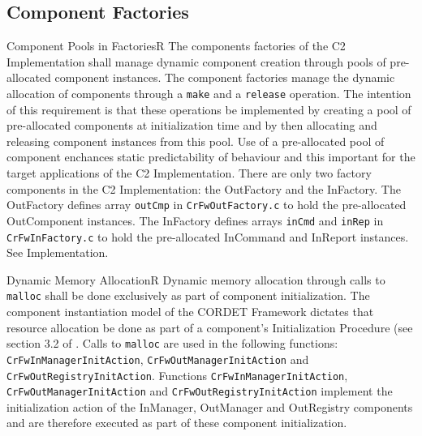 \documentclass{pnp_article}
\begin{document}
\subsection{Component Factories}

\begin{fwReqNote}{Component Pools in Factories}{R}
{The components factories of the C2 Implementation shall manage dynamic component creation through pools of pre-allocated component instances.}
{The component factories manage the dynamic allocation of components through a \texttt{make} and a \texttt{release} operation. The intention of this requirement is that these operations be implemented by creating a pool of pre-allocated components at initialization time and by then allocating and releasing component instances from this pool.}
{Use of a pre-allocated pool of component enchances static predictability of behaviour and this important for the target applications of the C2 Implementation.}
{There are only two factory components in the C2 Implementation: the OutFactory and the InFactory. The OutFactory defines array \texttt{outCmp} in \texttt{CrFwOutFactory.c} to hold the pre-allocated OutComponent instances. The InFactory defines arrays \texttt{inCmd} and \texttt{inRep} in \texttt{CrFwInFactory.c} to hold the pre-allocated InCommand and InReport instances. } 
{See Implementation.}
\end{fwReqNote}




\begin{fwReq}{Dynamic Memory Allocation}{R}
{Dynamic memory allocation through calls to \texttt{malloc} shall be done exclusively as part of component initialization.}
{The component instantiation model of the CORDET Framework dictates that resource allocation be done as part of a component's Initialization Procedure (see section 3.2 of \cite{ref:cordetfw}.}
{Calls to \texttt{malloc} are used in the following functions: \texttt{CrFwInManagerInitAction}, \texttt{CrFwOutManagerInitAction} and \texttt{CrFwOutRegistryInitAction}. } 
{Functions \texttt{CrFwInManagerInitAction}, \texttt{CrFwOutManagerInitAction} and \texttt{CrFwOutRegistryInitAction} implement the initialization action of the InManager, OutManager and OutRegistry components and are therefore executed as part of these component initialization.}
\end{fwReq}
\end{document}
